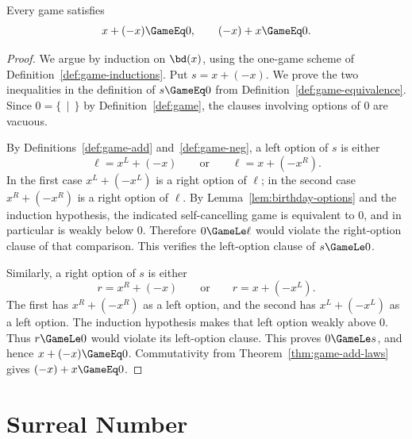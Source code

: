 \begin{theorem}
  \label{thm:game-add-inverse}
  \leanok
  Every game satisfies
  \[
    x+(-x)\GameEq0,
    \qquad
    (-x)+x\GameEq0.
  \]
\end{theorem}
\begin{proof}
  \leanok
  We argue by induction on \(\bd(x)\), using the one-game scheme of
  Definition~\ref{def:game-inductions}.  Put \(s=x+(-x)\).  We prove the two
  inequalities in the definition of \(s\GameEq0\) from
  Definition~\ref{def:game-equivalence}.  Since \(0=\{\,\mid\,\}\) by
  Definition~\ref{def:game}, the clauses involving options of \(0\) are
  vacuous.

  By Definitions~\ref{def:game-add} and~\ref{def:game-neg}, a left option of
  \(s\) is either
  \[
    \ell=x^L+(-x)
    \qquad\text{or}\qquad
    \ell=x+(-x^R).
  \]
  In the first case \(x^L+(-x^L)\) is a right option of \(\ell\); in the
  second case \(x^R+(-x^R)\) is a right option of \(\ell\).  By
  Lemma~\ref{lem:birthday-options} and the induction hypothesis, the indicated
  self-cancelling game is equivalent to \(0\), and in particular is weakly
  below \(0\).  Therefore \(0\GameLe\ell\) would violate the right-option
  clause of that comparison.  This verifies the left-option clause of
  \(s\GameLe0\).

  Similarly, a right option of \(s\) is either
  \[
    r=x^R+(-x)
    \qquad\text{or}\qquad
    r=x+(-x^L).
  \]
  The first has \(x^R+(-x^R)\) as a left option, and the second has
  \(x^L+(-x^L)\) as a left option.  The induction hypothesis makes that left
  option weakly above \(0\).  Thus \(r\GameLe0\) would violate its
  left-option clause.  This proves \(0\GameLe s\), and hence
  \(x+(-x)\GameEq0\).  Commutativity from
  Theorem~\ref{thm:game-add-laws} gives \((-x)+x\GameEq0\).
\end{proof}

\section{Surreal Number}

